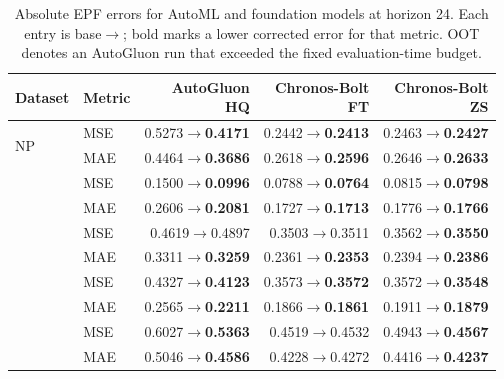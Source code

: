 \begin{table}[t]
\centering
\small
\setlength{\tabcolsep}{5pt}
\caption{Absolute EPF errors for AutoML and foundation models at horizon 24. Each entry is base$\rightarrow$\method{}; bold marks a lower corrected error for that metric. OOT denotes an AutoGluon run that exceeded the fixed evaluation-time budget.}
\label{tab:strong-epf-absolute-external}
\begin{tabular}{llrrr}
\toprule
Dataset & Metric & \shortstack{AutoGluon\\HQ} & \shortstack{Chronos-Bolt\\FT} & \shortstack{Chronos-Bolt\\ZS}\\
\midrule
\multirow{2}{*}{NP} & MSE & 0.5273$\rightarrow$\textbf{0.4171} & 0.2442$\rightarrow$\textbf{0.2413} & 0.2463$\rightarrow$\textbf{0.2427}\\
 & MAE & 0.4464$\rightarrow$\textbf{0.3686} & 0.2618$\rightarrow$\textbf{0.2596} & 0.2646$\rightarrow$\textbf{0.2633}\\
\addlinespace[1pt]
\multirow{2}{*}{PJM} & MSE & 0.1500$\rightarrow$\textbf{0.0996} & 0.0788$\rightarrow$\textbf{0.0764} & 0.0815$\rightarrow$\textbf{0.0798}\\
 & MAE & 0.2606$\rightarrow$\textbf{0.2081} & 0.1727$\rightarrow$\textbf{0.1713} & 0.1776$\rightarrow$\textbf{0.1766}\\
\addlinespace[1pt]
\multirow{2}{*}{BE} & MSE & 0.4619$\rightarrow$0.4897 & 0.3503$\rightarrow$0.3511 & 0.3562$\rightarrow$\textbf{0.3550}\\
 & MAE & 0.3311$\rightarrow$\textbf{0.3259} & 0.2361$\rightarrow$\textbf{0.2353} & 0.2394$\rightarrow$\textbf{0.2386}\\
\addlinespace[1pt]
\multirow{2}{*}{FR} & MSE & 0.4327$\rightarrow$\textbf{0.4123} & 0.3573$\rightarrow$\textbf{0.3572} & 0.3572$\rightarrow$\textbf{0.3548}\\
 & MAE & 0.2565$\rightarrow$\textbf{0.2211} & 0.1866$\rightarrow$\textbf{0.1861} & 0.1911$\rightarrow$\textbf{0.1879}\\
\addlinespace[1pt]
\multirow{2}{*}{DE} & MSE & 0.6027$\rightarrow$\textbf{0.5363} & 0.4519$\rightarrow$0.4532 & 0.4943$\rightarrow$\textbf{0.4567}\\
 & MAE & 0.5046$\rightarrow$\textbf{0.4586} & 0.4228$\rightarrow$0.4272 & 0.4416$\rightarrow$\textbf{0.4237}\\
\bottomrule
\end{tabular}
\end{table}
